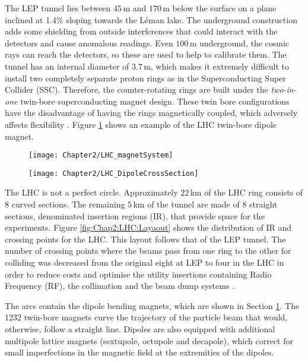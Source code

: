 The LEP tunnel lies between $45\,$m and $170\,$m below the surface on a plane inclined at 1.4\% sloping towards the Léman lake.
The underground construction adds some shielding from outside interferences that could interact with the detectors and cause 
anomalous readings. Even $100\,$m underground, the cosmic rays can reach the detectors, so these are used to help to calibrate them.
The tunnel has an internal diameter of $3.7\,$m, which makes it extremely difficult to install two completely separate proton rings
\cite{Blewett:103798} as in the Superconducting Super Collider (SSC). Therefore, the counter-rotating rings are built
under the \textit{two-in-one} twin-bore superconducting magnet design. 
These twin bore configurations have the disadvantage of having the rings magnetically coupled, which adversely affects flexibility \cite{Evans_2008}.
Figure \ref{fig:Chap2:LHC:DipoleCS} shows an example of the LHC twin-bore dipole magnet.

\begin{figure}
\centering
\begin{minipage}{.45\textwidth}
  \centering
  \texttt{[image: Chapter2/LHC\_magnetSystem]}
  \label{fig:Chap2:LHC:Layaout}
\end{minipage}%
\begin{minipage}{.54\textwidth}
  \centering
  \texttt{[image: Chapter2/LHC\_DipoleCrossSection]}
  \label{fig:Chap2:LHC:DipoleCS}
\end{minipage}
\end{figure}

The LHC is not a perfect circle. Approximately $22\,$km of the LHC ring consists of 8 curved sections. 
The remaining $5\,$km of the tunnel are made of 8 straight sections, denominated insertion regions (IR), that provide space for the experiments.
Figure \ref{fig:Chap2:LHC:Layaout} shows the distribution of IR and crossing points for the LHC. This layout follows that
of the LEP tunnel. The number of crossing points  where the beams pass from one ring to the
other for colliding was decreased from the original eight at LEP to four in the LHC in order to reduce costs and 
optimise the utility insertions containing Radio Frequency (RF), the collimation and the
beam dump systems \cite{Pettersson:291782}. 

The arcs contain the dipole bending magnets, which are shown in Section \ref{fig:Chap2:LHC:DipoleCS}.
The 1232 twin-bore magnets curve the trajectory of the particle beam that would, otherwise, follow a straight line.
Dipoles are also equipped with additional multipole lattice magnets (sextupole, octupole and decapole), which correct for small imperfections 
in the magnetic field at the extremities of the dipoles. 

